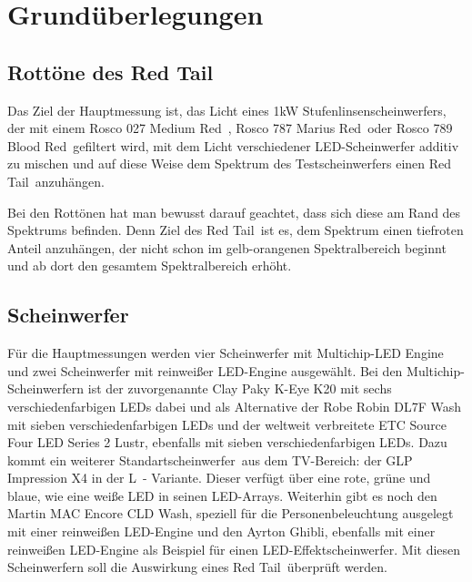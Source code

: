 \section{Grundüberlegungen}\label{sec_mgrund}


\subsection{Rottöne des \glqq Red Tail\grqq}
Das Ziel der Hauptmessung ist, das Licht eines 1kW Stufenlinsenscheinwerfers, der mit einem Rosco 027 \glqq Medium Red\grqq\ , Rosco 787 \glqq Marius Red\grqq\ oder Rosco 789 \glqq Blood Red\grqq\ gefiltert wird, mit dem Licht verschiedener LED-Scheinwerfer additiv zu mischen und auf diese Weise dem Spektrum des Testscheinwerfers einen \glqq Red Tail\grqq\ anzuhängen.

Bei den Rottönen hat man bewusst darauf geachtet, dass sich diese am Rand des Spektrums befinden. Denn Ziel des \glqq Red Tail\grqq\ ist es, dem Spektrum einen tiefroten Anteil anzuhängen, der nicht schon im gelb-orangenen Spektralbereich beginnt und ab dort den gesamtem Spektralbereich erhöht.  

\subsection{Scheinwerfer}
Für die Hauptmessungen werden vier Scheinwerfer mit Multichip-LED Engine und zwei Scheinwerfer mit reinweißer LED-Engine ausgewählt. Bei den Multichip-Scheinwerfern ist der zuvorgenannte Clay Paky K-Eye K20 mit sechs verschiedenfarbigen LEDs dabei und als Alternative der Robe Robin DL7F Wash mit sieben verschiedenfarbigen LEDs und der weltweit verbreitete ETC Source Four LED Series 2 Lustr, ebenfalls mit sieben verschiedenfarbigen LEDs. Dazu kommt ein weiterer \glqq Standartscheinwerfer\grqq\ aus dem TV-Bereich: der GLP Impression X4 in der \glqq L\grqq\ - Variante. Dieser verfügt über eine rote, grüne und blaue, wie eine weiße LED in seinen LED-Arrays. Weiterhin gibt es noch den Martin MAC Encore CLD Wash, speziell für die Personenbeleuchtung ausgelegt mit einer reinweißen LED-Engine und den Ayrton Ghibli, ebenfalls mit einer reinweißen LED-Engine als Beispiel für einen LED-Effektscheinwerfer. 
Mit diesen Scheinwerfern soll die Auswirkung eines \glqq Red Tail\grqq\ überprüft werden.


